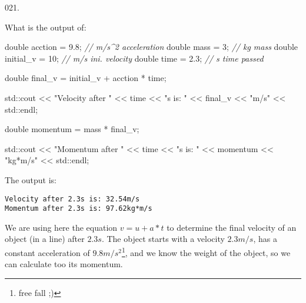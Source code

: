 \documentclass[]{book}
\newenvironment{Shaded}{}{}
\newcommand{\BuiltInTok}[1]{#1}
\newcommand{\CommentTok}[1]{\textcolor[rgb]{0.38,0.63,0.69}{\textit{#1}}}
\newcommand{\DataTypeTok}[1]{\textcolor[rgb]{0.56,0.13,0.00}{#1}}
\newcommand{\DecValTok}[1]{\textcolor[rgb]{0.25,0.63,0.44}{#1}}
\newcommand{\FloatTok}[1]{\textcolor[rgb]{0.25,0.63,0.44}{#1}}
\newcommand{\NormalTok}[1]{#1}
\newcommand{\StringTok}[1]{\textcolor[rgb]{0.25,0.44,0.63}{#1}}
\begin{document}
\vspace{2mm}\noindent\hrulefill{}

\begin{minipage}{\linewidth}\noindent
{\tiny 021.}\\
\begin{minipage}[t]{.485\linewidth}

What is the output of:

\begin{framed}

\begin{Shaded}
\begin{Highlighting}[]
\DataTypeTok{double}\NormalTok{ acction   = }\FloatTok{9.8}\NormalTok{; }\CommentTok{// m/s^2 acceleration}
\DataTypeTok{double}\NormalTok{ mass      = }\DecValTok{3}\NormalTok{;   }\CommentTok{// kg    mass}
\DataTypeTok{double}\NormalTok{ initial_v = }\DecValTok{10}\NormalTok{;  }\CommentTok{// m/s   ini. velocity}
\DataTypeTok{double}\NormalTok{ time      = }\FloatTok{2.3}\NormalTok{; }\CommentTok{// s     time passed}

\DataTypeTok{double}\NormalTok{ final_v = initial_v + acction * time;}

\BuiltInTok{std::}\NormalTok{cout << }\StringTok{"Velocity after "}\NormalTok{ << time}
\NormalTok{          << }\StringTok{"s is: "}\NormalTok{ << final_v << }\StringTok{"m/s"}
\NormalTok{          << }\BuiltInTok{std::}\NormalTok{endl;}

\DataTypeTok{double}\NormalTok{ momentum = mass * final_v;}

\BuiltInTok{std::}\NormalTok{cout << }\StringTok{"Momentum after "}\NormalTok{ << time}
\NormalTok{          << }\StringTok{"s is: "}\NormalTok{ << momentum << }\StringTok{"kg*m/s"}
\NormalTok{          << }\BuiltInTok{std::}\NormalTok{endl;}
\end{Highlighting}
\end{Shaded}

\end{framed}

\end{minipage}
\hfill
\begin{minipage}[t]{.485\linewidth}

The output is:

\begin{framed}

\begin{verbatim}
Velocity after 2.3s is: 32.54m/s
Momentum after 2.3s is: 97.62kg*m/s
\end{verbatim}

\end{framed}

We are using here the equation \(v = u + a*t\) to determine the final
velocity of an object (in a line) after \(2.3 s\). The object starts
with a velocity \(2.3 m/s\), has a constant acceleration of
\(9.8 m/s^2\)\footnote{free fall ;)}, and we know the weight of the
object, so we can calculate too its momentum.

\end{minipage}
\end{minipage}
\end{document}
